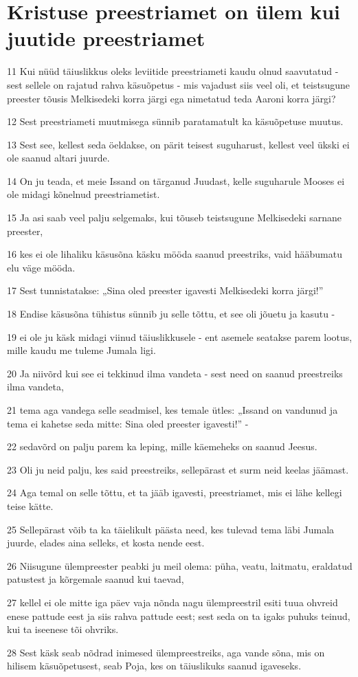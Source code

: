 \section*{Kristuse preestriamet on ülem kui juutide preestriamet}

\par 11 Kui nüüd täiuslikkus oleks leviitide preestriameti kaudu olnud saavutatud - sest sellele on rajatud rahva käsuõpetus - mis vajadust siis veel oli, et teistsugune preester tõusis Melkisedeki korra järgi ega nimetatud teda Aaroni korra järgi?
\par 12 Sest preestriameti muutmisega sünnib paratamatult ka käsuõpetuse muutus.
\par 13 Sest see, kellest seda öeldakse, on pärit teisest suguharust, kellest veel ükski ei ole saanud altari juurde.
\par 14 On ju teada, et meie Issand on tärganud Juudast, kelle suguharule Mooses ei ole midagi kõnelnud preestriametist.
\par 15 Ja asi saab veel palju selgemaks, kui tõuseb teistsugune Melkisedeki sarnane preester,
\par 16 kes ei ole lihaliku käsusõna käsku mööda saanud preestriks, vaid hääbumatu elu väge mööda.
\par 17 Sest tunnistatakse: „Sina oled preester igavesti Melkisedeki korra järgi!”
\par 18 Endise käsusõna tühistus sünnib ju selle tõttu, et see oli jõuetu ja kasutu -
\par 19 ei ole ju käsk midagi viinud täiuslikkusele - ent asemele seatakse parem lootus, mille kaudu me tuleme Jumala ligi.
\par 20 Ja niivõrd kui see ei tekkinud ilma vandeta - sest need on saanud preestreiks ilma vandeta,
\par 21 tema aga vandega selle seadmisel, kes temale ütles: „Issand on vandunud ja tema ei kahetse seda mitte: Sina oled preester igavesti!” -
\par 22 sedavõrd on palju parem ka leping, mille käemeheks on saanud Jeesus.
\par 23 Oli ju neid palju, kes said preestreiks, sellepärast et surm neid keelas jäämast.
\par 24 Aga temal on selle tõttu, et ta jääb igavesti, preestriamet, mis ei lähe kellegi teise kätte.
\par 25 Sellepärast võib ta ka täielikult päästa need, kes tulevad tema läbi Jumala juurde, elades aina selleks, et kosta nende eest.
\par 26 Niisugune ülempreester peabki ju meil olema: püha, veatu, laitmatu, eraldatud patustest ja kõrgemale saanud kui taevad,
\par 27 kellel ei ole mitte iga päev vaja nõnda nagu ülempreestril esiti tuua ohvreid enese pattude eest ja siis rahva pattude eest; sest seda on ta igaks puhuks teinud, kui ta iseenese tõi ohvriks.
\par 28 Sest käsk seab nõdrad inimesed ülempreestreiks, aga vande sõna, mis on hilisem käsuõpetusest, seab Poja, kes on täiuslikuks saanud igaveseks.



